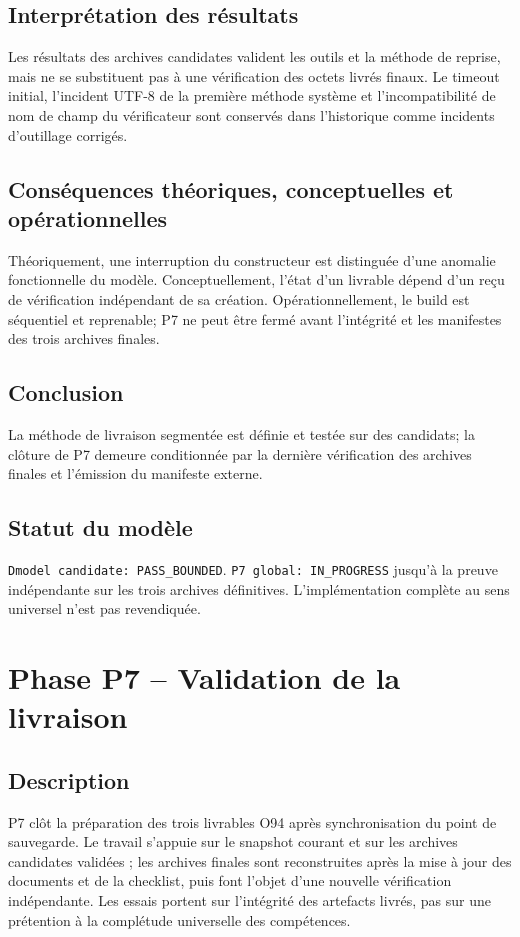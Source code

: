 \documentclass[11pt,a4paper]{article}
\begin{document}
\subsection{Interprétation des résultats}
Les résultats des archives candidates valident les outils et la méthode de reprise, mais ne se substituent pas à une vérification des octets livrés finaux. Le timeout initial, l'incident UTF-8 de la première méthode système et l'incompatibilité de nom de champ du vérificateur sont conservés dans l'historique comme incidents d'outillage corrigés.
\subsection{Conséquences théoriques, conceptuelles et opérationnelles}
Théoriquement, une interruption du constructeur est distinguée d'une anomalie fonctionnelle du modèle. Conceptuellement, l'état d'un livrable dépend d'un reçu de vérification indépendant de sa création. Opérationnellement, le build est séquentiel et reprenable; P7 ne peut être fermé avant l'intégrité et les manifestes des trois archives finales.
\subsection{Conclusion}
La méthode de livraison segmentée est définie et testée sur des candidats; la clôture de P7 demeure conditionnée par la dernière vérification des archives finales et l'émission du manifeste externe.
\subsection{Statut du modèle}
\texttt{Dmodel candidate: PASS\_BOUNDED}. \texttt{P7 global: IN\_PROGRESS} jusqu'à la preuve indépendante sur les trois archives définitives. L'implémentation complète au sens universel n'est pas revendiquée.

\section{Phase P7 -- Validation de la livraison}

\subsection{Description}
P7 clôt la préparation des trois livrables O94 après synchronisation du point de sauvegarde. Le travail s'appuie sur le snapshot courant et sur les archives candidates validées ; les archives finales sont reconstruites après la mise à jour des documents et de la checklist, puis font l'objet d'une nouvelle vérification indépendante. Les essais portent sur l'intégrité des artefacts livrés, pas sur une prétention à la complétude universelle des compétences.
\end{document}
